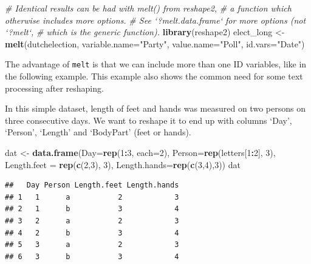 \documentclass[]{book}
\newenvironment{Shaded}{\begin{snugshade}}{\end{snugshade}}
\newcommand{\CommentTok}[1]{\textcolor[rgb]{0.56,0.35,0.01}{\textit{#1}}}
\newcommand{\DataTypeTok}[1]{\textcolor[rgb]{0.13,0.29,0.53}{#1}}
\newcommand{\DecValTok}[1]{\textcolor[rgb]{0.00,0.00,0.81}{#1}}
\newcommand{\KeywordTok}[1]{\textcolor[rgb]{0.13,0.29,0.53}{\textbf{#1}}}
\newcommand{\NormalTok}[1]{#1}
\newcommand{\OperatorTok}[1]{\textcolor[rgb]{0.81,0.36,0.00}{\textbf{#1}}}
\newcommand{\StringTok}[1]{\textcolor[rgb]{0.31,0.60,0.02}{#1}}
\begin{document}
\begin{Shaded}
\begin{Highlighting}[]
\CommentTok{# Identical results can be had with melt() from reshape2,}
\CommentTok{# a function which otherwise includes more options.}
\CommentTok{# See `?melt.data.frame` for more options (not `?melt`, }
\CommentTok{# which is the generic function).}
\KeywordTok{library}\NormalTok{(reshape2)}
\NormalTok{elect_long <-}\StringTok{ }\KeywordTok{melt}\NormalTok{(dutchelection, }\DataTypeTok{variable.name=}\StringTok{"Party"}\NormalTok{, }\DataTypeTok{value.name=}\StringTok{"Poll"}\NormalTok{, }\DataTypeTok{id.vars=}\StringTok{"Date"}\NormalTok{)}
\end{Highlighting}
\end{Shaded}

The advantage of \texttt{melt} is that we can include more than one ID variables, like in the following example. This example also shows the common need for some text processing after reshaping.

In this simple dataset, length of feet and hands was measured on two persons on three consecutive days. We want to reshape it to end up with columns `Day', `Person', `Length' and `BodyPart' (feet or hands).

\begin{Shaded}
\begin{Highlighting}[]
\NormalTok{dat <-}\StringTok{ }\KeywordTok{data.frame}\NormalTok{(}\DataTypeTok{Day=}\KeywordTok{rep}\NormalTok{(}\DecValTok{1}\OperatorTok{:}\DecValTok{3}\NormalTok{, }\DataTypeTok{each=}\DecValTok{2}\NormalTok{), }\DataTypeTok{Person=}\KeywordTok{rep}\NormalTok{(letters[}\DecValTok{1}\OperatorTok{:}\DecValTok{2}\NormalTok{], }\DecValTok{3}\NormalTok{), }
                  \DataTypeTok{Length.feet =} \KeywordTok{rep}\NormalTok{(}\KeywordTok{c}\NormalTok{(}\DecValTok{2}\NormalTok{,}\DecValTok{3}\NormalTok{), }\DecValTok{3}\NormalTok{),}
                  \DataTypeTok{Length.hands=}\KeywordTok{rep}\NormalTok{(}\KeywordTok{c}\NormalTok{(}\DecValTok{3}\NormalTok{,}\DecValTok{4}\NormalTok{),}\DecValTok{3}\NormalTok{))}
\NormalTok{dat}
\end{Highlighting}
\end{Shaded}

\begin{verbatim}
##   Day Person Length.feet Length.hands
## 1   1      a           2            3
## 2   1      b           3            4
## 3   2      a           2            3
## 4   2      b           3            4
## 5   3      a           2            3
## 6   3      b           3            4
\end{verbatim}
\end{document}
